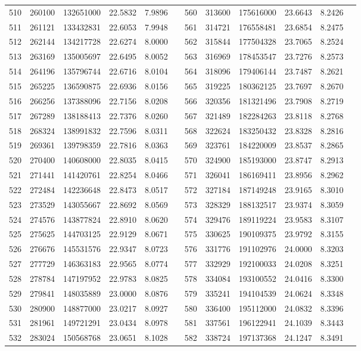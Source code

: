 \begin{longtable}{SSSSSSSSSSSS}
510&260100&132651000&22.5832&7.9896&&560&313600&175616000&23.6643&8.2426\\
511&261121&133432831&22.6053&7.9948&&561&314721&176558481&23.6854&8.2475\\
512&262144&134217728&22.6274&8.0000&&562&315844&177504328&23.7065&8.2524\\
513&263169&135005697&22.6495&8.0052&&563&316969&178453547&23.7276&8.2573\\
514&264196&135796744&22.6716&8.0104&&564&318096&179406144&23.7487&8.2621\\
515&265225&136590875&22.6936&8.0156&&565&319225&180362125&23.7697&8.2670\\
516&266256&137388096&22.7156&8.0208&&566&320356&181321496&23.7908&8.2719\\
517&267289&138188413&22.7376&8.0260&&567&321489&182284263&23.8118&8.2768\\
518&268324&138991832&22.7596&8.0311&&568&322624&183250432&23.8328&8.2816\\
519&269361&139798359&22.7816&8.0363&&569&323761&184220009&23.8537&8.2865\\
520&270400&140608000&22.8035&8.0415&&570&324900&185193000&23.8747&8.2913\\
521&271441&141420761&22.8254&8.0466&&571&326041&186169411&23.8956&8.2962\\
522&272484&142236648&22.8473&8.0517&&572&327184&187149248&23.9165&8.3010\\
523&273529&143055667&22.8692&8.0569&&573&328329&188132517&23.9374&8.3059\\
524&274576&143877824&22.8910&8.0620&&574&329476&189119224&23.9583&8.3107\\
525&275625&144703125&22.9129&8.0671&&575&330625&190109375&23.9792&8.3155\\
526&276676&145531576&22.9347&8.0723&&576&331776&191102976&24.0000&8.3203\\
527&277729&146363183&22.9565&8.0774&&577&332929&192100033&24.0208&8.3251\\
528&278784&147197952&22.9783&8.0825&&578&334084&193100552&24.0416&8.3300\\
529&279841&148035889&23.0000&8.0876&&579&335241&194104539&24.0624&8.3348\\
530&280900&148877000&23.0217&8.0927&&580&336400&195112000&24.0832&8.3396\\
531&281961&149721291&23.0434&8.0978&&581&337561&196122941&24.1039&8.3443\\
532&283024&150568768&23.0651&8.1028&&582&338724&197137368&24.1247&8.3491\\

\end{longtable}
